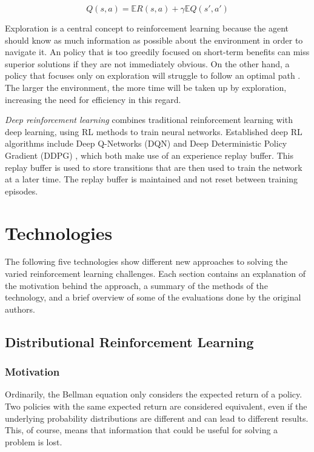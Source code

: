 \documentclass[runningheads]{llncs}
\begin{document}
$$Q(s,a) = \mathbb{E} R(s,a) + \gamma \mathbb{E} Q(s',a')$$

Exploration is a central concept to reinforcement learning because the agent should know as much information as possible about the environment in order to navigate it. An policy that is too greedily focused on short-term benefits can miss superior solutions if they are not immediately obvious. On the other hand, a policy that focuses only on exploration will struggle to follow an optimal path \cite{sutton2018reinforcement}. The larger the environment, the more time will be taken up by exploration, increasing the need for efficiency in this regard.

\textit{Deep reinforcement learning} combines traditional reinforcement learning with deep learning, using RL methods to train neural networks. Established deep RL algorithms include Deep Q-Networks (DQN) \cite{mnih2013playing} and Deep Deterministic Policy Gradient (DDPG) \cite{lillicrap2015continuous}, which both make use of an experience replay buffer. This replay buffer is used to store transitions that are then used to train the network at a later time. The replay buffer is maintained and not reset between training episodes.

\section{Technologies}

The following five technologies show different new approaches to solving the varied reinforcement learning challenges. Each section contains an explanation of the motivation behind the approach, a summary of the methods of the technology, and a brief overview of some of the evaluations done by the original authors.

\subsection{Distributional Reinforcement Learning}

\subsubsection{Motivation}

Ordinarily, the Bellman equation only considers the expected return of a policy. Two policies with the same expected return are considered equivalent, even if the underlying probability distributions are different and can lead to different results. This, of course, means that information that could be useful for solving a problem is lost.
\end{document}
